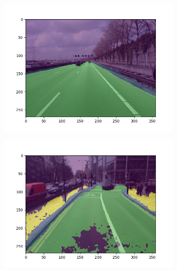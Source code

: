 \begin{figure}
	\begin{subfigure}{.45\textwidth}
		\centering
		\includegraphics[width=\linewidth]{figures/experiments/results-mapillary/3.png}
		\caption[Mapillary Vistas Segmentation Result 3]{}
		\label{fig:mapresult-3}
	\end{subfigure}
	\hfill
	\begin{subfigure}{.45\textwidth}
		\centering
		\includegraphics[width=\linewidth]{figures/experiments/results-mapillary/4.png}
		\caption[Mapillary Vistas Segmentation Result 4]{}
		\label{fig:mapresult-4}
	\end{subfigure}

	\vspace{12pt}%
	

\end{figure}
